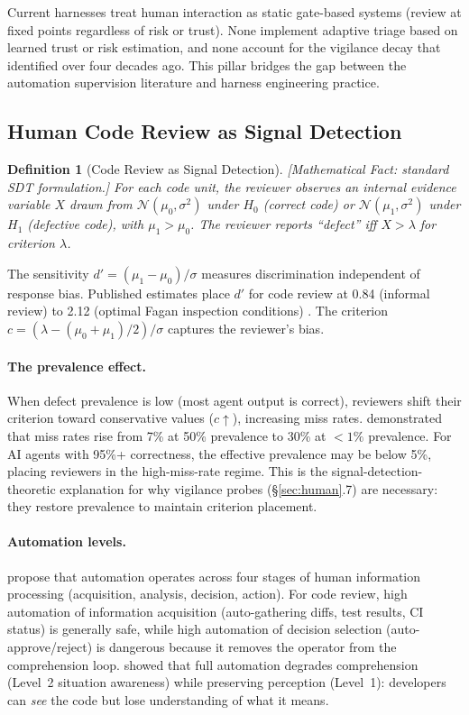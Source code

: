 \documentclass[11pt, a4paper]{googledeepmind}
\newtheorem{definition}{Definition}[section]
\begin{document}
Current harnesses treat human interaction as static gate-based systems (review at fixed points regardless of risk or trust). None implement adaptive triage based on learned trust or risk estimation, and none account for the vigilance decay that \citet{bainbridge1983ironies} identified over four decades ago. This pillar bridges the gap between the automation supervision literature and harness engineering practice.

\subsection{Human Code Review as Signal Detection}

\begin{definition}[Code Review as Signal Detection]
\label{def:sdt}
\emph{[Mathematical Fact: standard SDT formulation.]}
For each code unit, the reviewer observes an internal evidence variable $X$ drawn from $\mathcal{N}(\mu_0, \sigma^2)$ under $H_0$ (correct code) or $\mathcal{N}(\mu_1, \sigma^2)$ under $H_1$ (defective code), with $\mu_1 > \mu_0$. The reviewer reports ``defect'' iff $X > \lambda$ for criterion $\lambda$.
\end{definition}

The sensitivity $d' = (\mu_1 - \mu_0)/\sigma$ measures discrimination independent of response bias. Published estimates place $d'$ for code review at 0.84 (informal review) to 2.12 (optimal Fagan inspection conditions) \citep{fagan1976design, cohen2006best}. The criterion $c = (\lambda - (\mu_0 + \mu_1)/2)/\sigma$ captures the reviewer's bias.

\paragraph{The prevalence effect.} When defect prevalence is low (most agent output is correct), reviewers shift their criterion toward conservative values ($c \uparrow$), increasing miss rates. \citet{wolfe2005low} demonstrated that miss rates rise from 7\% at 50\% prevalence to 30\% at $<1\%$ prevalence. For AI agents with 95\%+ correctness, the effective prevalence may be below 5\%, placing reviewers in the high-miss-rate regime. This is the signal-detection-theoretic explanation for why vigilance probes (\S\ref{sec:human}.7) are necessary: they restore prevalence to maintain criterion placement.

\paragraph{Automation levels.} \citet{parasuraman2000model} propose that automation operates across four stages of human information processing (acquisition, analysis, decision, action). For code review, high automation of information acquisition (auto-gathering diffs, test results, CI status) is generally safe, while high automation of decision selection (auto-approve/reject) is dangerous because it removes the operator from the comprehension loop. \citet{endsley1995outofloop} showed that full automation degrades comprehension (Level~2 situation awareness) while preserving perception (Level~1): developers can \emph{see} the code but lose understanding of what it means.
\end{document}
